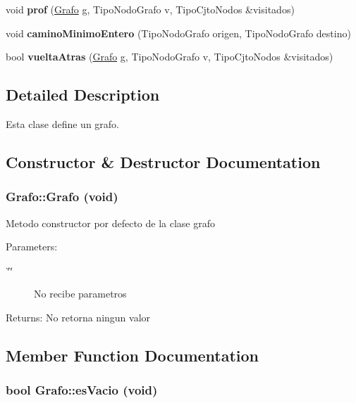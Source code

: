 \begin{CompactItemize}
\item 
\hypertarget{classGrafo_8a8a0ae579d4a09086310e7e0af04e91}{
void \textbf{prof} (\hyperlink{classGrafo}{Grafo} g, TipoNodoGrafo v, TipoCjtoNodos \&visitados)}
\label{classGrafo_8a8a0ae579d4a09086310e7e0af04e91}

\item 
\hypertarget{classGrafo_155d72a8aa6b3580129c06c45ee8e848}{
void \textbf{caminoMinimoEntero} (TipoNodoGrafo origen, TipoNodoGrafo destino)}
\label{classGrafo_155d72a8aa6b3580129c06c45ee8e848}

\item 
\hypertarget{classGrafo_b4b15e8634d278300fdda38022888670}{
bool \textbf{vueltaAtras} (\hyperlink{classGrafo}{Grafo} g, TipoNodoGrafo v, TipoCjtoNodos \&visitados)}
\label{classGrafo_b4b15e8634d278300fdda38022888670}

\end{CompactItemize}


\subsection{Detailed Description}
Esta clase define un grafo. 

\subsection{Constructor \& Destructor Documentation}
\hypertarget{classGrafo_7b86c2cd9e014eaf972dcd4d2e780c48}{
\subsubsection[Grafo]{\setlength{\rightskip}{0pt plus 5cm}Grafo::Grafo (void)}}
\label{classGrafo_7b86c2cd9e014eaf972dcd4d2e780c48}


Metodo constructor por defecto de la clase grafo \begin{Desc}
\item[Parameters:]
\begin{description}
\item[{\em \char`\"{}\char`\"{}}]No recibe parametros \end{description}
\end{Desc}
\begin{Desc}
\item[Returns:]No retorna ningun valor \end{Desc}


\subsection{Member Function Documentation}
\hypertarget{classGrafo_c6b3070591d565cab5efb6b5aac62bef}{
\subsubsection[esVacio]{\setlength{\rightskip}{0pt plus 5cm}bool Grafo::esVacio (void)}}
\label{classGrafo_c6b3070591d565cab5efb6b5aac62bef}


